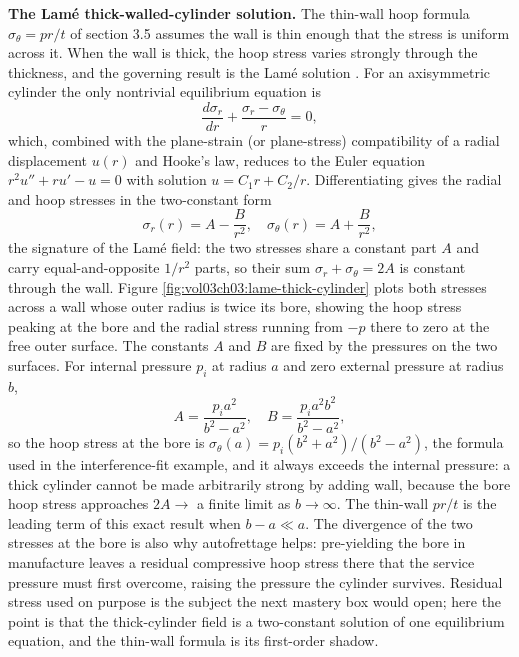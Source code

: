 \begin{mastery}
\textbf{The Lam\'e thick-walled-cylinder solution.} The thin-wall hoop
formula $\sigma_\theta = pr/t$ of section 3.5 assumes the wall is thin
enough that the stress is uniform across it. When the wall is thick, the
hoop stress varies strongly through the thickness, and the governing
result is the Lam\'e solution \cite[ch.~10]{text:crandall-mech-of-solids}.
For an axisymmetric cylinder the only nontrivial equilibrium equation is
\[
\frac{d\sigma_r}{dr} + \frac{\sigma_r - \sigma_\theta}{r} = 0,
\]
which, combined with the plane-strain (or plane-stress) compatibility of
a radial displacement $u(r)$ and Hooke's law, reduces to the Euler
equation $r^2 u'' + r u' - u = 0$ with solution $u = C_1 r + C_2/r$.
Differentiating gives the radial and hoop stresses in the two-constant
form
\[
\sigma_r(r) = A - \frac{B}{r^2}, \quad \sigma_\theta(r) = A +
\frac{B}{r^2},
\]
the signature of the Lam\'e field: the two stresses share a constant part
$A$ and carry equal-and-opposite $1/r^2$ parts, so their sum
$\sigma_r + \sigma_\theta = 2A$ is constant through the wall. Figure
\ref{fig:vol03ch03:lame-thick-cylinder} plots both stresses across a wall
whose outer radius is twice its bore, showing the hoop stress peaking at
the bore and the radial stress running from $-p$ there to zero at the free
outer surface. The
constants $A$ and $B$ are fixed by the pressures on the two surfaces. For
internal pressure $p_i$ at radius $a$ and zero external pressure at
radius $b$,
\[
A = \frac{p_i a^2}{b^2 - a^2}, \quad B = \frac{p_i a^2 b^2}{b^2 - a^2},
\]
so the hoop stress at the bore is $\sigma_\theta(a) = p_i(b^2 + a^2)/(b^2
- a^2)$, the formula used in the interference-fit example, and it always
exceeds the internal pressure: a thick cylinder cannot be made
arbitrarily strong by adding wall, because the bore hoop stress
approaches $2A \to$ a finite limit as $b \to \infty$. The thin-wall
$pr/t$ is the leading term of this exact result when $b - a \ll a$. The
divergence of the two stresses at the bore is also why autofrettage
helps: pre-yielding the bore in manufacture leaves a residual compressive
hoop stress there that the service pressure must first overcome, raising
the pressure the cylinder survives. Residual stress used on purpose is
the subject the next mastery box would open; here the point is that the
thick-cylinder field is a two-constant solution of one equilibrium
equation, and the thin-wall formula is its first-order shadow.
\end{mastery}



